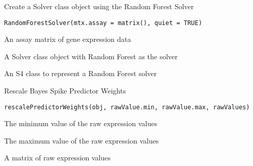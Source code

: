 \documentclass[a4paper]{book}
\begin{document}
%
\begin{Description}\relax
Create a Solver class object using the Random Forest Solver
\end{Description}
%
\begin{Usage}
\begin{verbatim}
RandomForestSolver(mtx.assay = matrix(), quiet = TRUE)
\end{verbatim}
\end{Usage}
%
\begin{Arguments}
\begin{ldescription}
\item[\code{mtx.assay}] An assay matrix of gene expression data
\end{ldescription}
\end{Arguments}
%
\begin{Value}
A Solver class object with Random Forest as the solver
\end{Value}
%
\begin{Description}\relax
An S4 class to represent a Random Forest solver
\end{Description}
%
\begin{Description}\relax
Rescale Bayes Spike Predictor Weights
\end{Description}
%
\begin{Usage}
\begin{verbatim}
rescalePredictorWeights(obj, rawValue.min, rawValue.max, rawValues)
\end{verbatim}
\end{Usage}
%
\begin{Arguments}
\begin{ldescription}
\item[\code{rawValue.min}] The minimum value of the raw expression values

\item[\code{rawValue.max}] The maximum value of the raw expression values

\item[\code{rawValues}] A matrix of raw expression values
\end{ldescription}
\end{Arguments}
\end{document}
